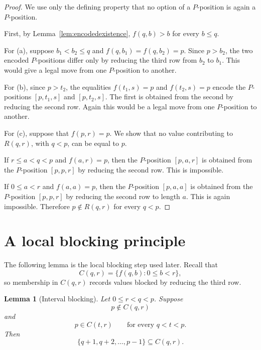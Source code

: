 \documentclass[11pt]{article}
\newtheorem{lemma}[theorem]{Lemma}
\begin{document}
\begin{proof}
We use only the defining property that no option of a $P$-position is again a
$P$-position.

First, by Lemma~\ref{lem:encodedexistence}, $f(q,b)>b$ for every $b\le q$.

For (a), suppose $b_1<b_2\le q$ and $f(q,b_1)=f(q,b_2)=p$. Since $p>b_2$,
the two encoded $P$-positions differ only by reducing the third row from
$b_2$ to $b_1$. This would give a legal move from one $P$-position to another.

For (b), since $p>t_2$, the equalities $f(t_1,s)=p$ and $f(t_2,s)=p$ encode
the $P$-positions $[p,t_1,s]$ and $[p,t_2,s]$. The first is obtained from the
second by reducing the second row. Again this would be a legal move from one
$P$-position to another.

For (c), suppose that $f(p,r)=p$. We show that no value contributing to
$R(q,r)$, with $q<p$, can be equal to $p$.

If $r\le a<q<p$ and $f(a,r)=p$, then the $P$-position $[p,a,r]$ is obtained
from the $P$-position $[p,p,r]$ by reducing the second row. This is
impossible.

If $0\le a<r$ and $f(a,a)=p$, then the $P$-position $[p,a,a]$ is obtained
from the $P$-position $[p,p,r]$ by reducing the second row to length $a$.
This is again impossible. Therefore $p\notin R(q,r)$ for every $q<p$.
\end{proof}

\section{A local blocking principle}

The following lemma is the local blocking step used later. Recall that
\[
        C(q,r)=\{f(q,b):0\le b<r\},
\]
so membership in \(C(q,r)\) records values blocked by reducing the third row.

\begin{lemma}[Interval blocking]\label{lem:intervalblocking}
Let $0\le r<q<p$. Suppose
\[
        p\notin C(q,r)
\]
and
\[
        p\in C(t,r)\qquad\text{for every } q<t<p.
\]
Then
\[
        \{q+1,q+2,\ldots,p-1\}\subseteq C(q,r).
\]
\end{lemma}
\end{document}
